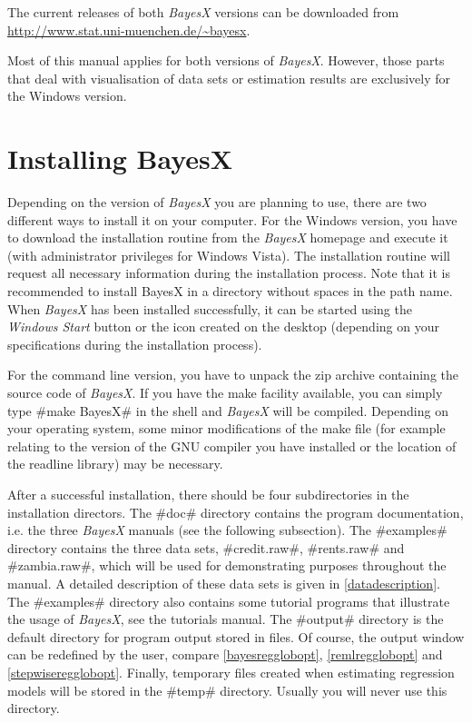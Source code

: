 The current releases of both {\em BayesX} versions can be downloaded from \href{http://www.stat.uni-muenchen.de/~bayesx}
{http://www.stat.uni-muenchen.de/\~{}bayesx}.

Most of this manual applies for both versions of {\it BayesX}. However, those parts that deal with visualisation of data sets
or estimation results are exclusively for the Windows version.

\section{Installing BayesX}\label{installbayesx}
 

Depending on the version of {\it BayesX} you are planning to use, there are two different ways to install it on your computer.
For the Windows version, you have to download the installation routine from the {\em BayesX} homepage and execute it (with
administrator privileges for Windows Vista). The installation routine will request all necessary information during the
installation process. Note that it is recommended to install BayesX in a directory without spaces in the path name. When {\em
BayesX} has been installed successfully, it can be started using the {\em Windows Start} button or the icon created on the
desktop (depending on your specifications during the installation process).

For the command line version, you have to unpack the zip archive containing the source code of {\it BayesX}. If you have the
make facility available, you can simply type #make BayesX# in the shell and {\it BayesX} will be compiled. Depending on your
operating system, some minor modifications of the make file (for example relating to the version of the GNU compiler you have
installed or the location of the readline library) may be necessary.

After a successful installation, there should be four subdirectories in the installation directors. The #doc# directory
contains the program documentation, i.e. the three {\em BayesX} manuals (see the following subsection). The #examples#
directory contains the three data sets, #credit.raw#, #rents.raw# and #zambia.raw#, which will be used for demonstrating
purposes throughout the manual. A detailed description of these data sets is given in \autoref{datadescription}. The #examples#
directory also contains some tutorial programs that illustrate the usage of {\em BayesX}, see the tutorials manual. The
#output# directory is the default directory for program output stored in files. Of course, the output window can be redefined
by the user, compare \autoref{bayesregglobopt}, \autoref{remlregglobopt} and \autoref{stepwiseregglobopt}. Finally, temporary
files created when estimating regression models will be stored in the #temp# directory. Usually you will never use this
directory.

